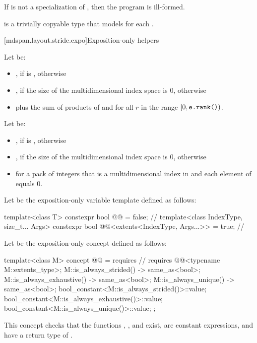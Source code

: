 \pnum
If  is not a specialization of ,
then the program is ill-formed.

\pnum
{} is a trivially copyable type
that models  for each .

[mdspan.layout.stride.expo]{Exposition-only helpers}

\pnum
Let  be:
\begin{itemize}
\item
{}, if  is , otherwise
\item
{}, if the size of the multidimensional index space  is 0, otherwise
\item
{} plus the sum of products of  and 
for all $r$ in the range $[0, \texttt{e.rank()})$.
\end{itemize}

\pnum
Let  be:
\begin{itemize}
\item
{}, if  is , otherwise
\item
{}, if the size of the multidimensional index space  is 0, otherwise
\item
{} for a pack of integers 
that is a multidimensional index in  and
each element of  equals 0.
\end{itemize}

\pnum
Let  be the exposition-only variable template
defined as follows:
\begin{codeblock}
template<class T>
  constexpr bool @@ = false;                              // \expos
template<class IndexType, size_t... Args>
  constexpr bool @@<extents<IndexType, Args...>> = true;  // \expos
\end{codeblock}

\pnum
Let  be the exposition-only concept
defined as follows:
\begin{codeblock}
template<class M>
concept @@ = requires {                         // \expos
  requires @@<typename M::extents_type>;
  { M::is_always_strided() } -> same_as<bool>;
  { M::is_always_exhaustive() } -> same_as<bool>;
  { M::is_always_unique() } -> same_as<bool>;
  bool_constant<M::is_always_strided()>::value;
  bool_constant<M::is_always_exhaustive()>::value;
  bool_constant<M::is_always_unique()>::value;
};
\end{codeblock}
\begin{note}
This concept checks that the functions
,
, and
 exist,
are constant expressions, and
have a return type of .
\end{note}

